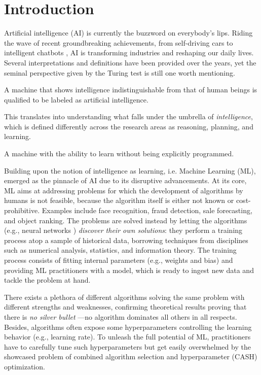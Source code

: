 \chapter{Introduction}
\label{chap:intro}

Artificial intelligence (AI) is currently the buzzword on everybody's lips.
Riding the wave of recent groundbreaking achievements, from self-driving cars \citep{} to intelligent chatbots \citep{}, AI is transforming industries and reshaping our daily lives.
Several interpretations and definitions have been provided over the years, yet the seminal perspective given by the Turing test \citep{turing1980computing} is still one worth mentioning.
\begin{definition}
A machine that shows intelligence indistinguishable from that of human beings is qualified to be labeled as artificial intelligence.
\end{definition}
This translates into understanding what falls under the umbrella of \textit{intelligence}, which is defined differently across the research areas as reasoning, planning, and learning.
\begin{definition}
A machine with the ability to learn without being explicitly programmed.
\end{definition}
Building upon the notion of intelligence as learning, i.e. Machine Learning (ML), emerged as the pinnacle of AI due to its disruptive advancements.
At its core, ML aims at addressing problems for which the development of algorithms by humans is not feasible, because the algorithm itself is either not known or cost-prohibitive.
Examples include face recognition, fraud detection, sale forecasting, and object ranking.
The problems are solved instead by letting the algorithms (e.g., neural networks \cite{nn}) \textit{discover their own solutions}: they perform a training process atop a sample of historical data, borrowing techniques from disciplines such as numerical analysis, statistics, and information theory.
The training process consists of fitting internal parameters (e.g., weights and bias) and providing ML practitioners with a model, which is ready to ingest new data and tackle the problem at hand.

There exists a plethora of different algorithms solving the same problem with different strengths and weaknesses, confirming theoretical results proving that there is \textit{no silver bullet} \cite{kerschke2019automated}---no algorithm dominates all others in all respects.
Besides, algorithms often expose some hyperparameters controlling the learning behavior (e.g., learning rate).
To unleash the full potential of ML, practitioners have to carefully tune such hyperparameters but get easily overwhelmed by the showcased problem of combined algorithm selection and hyperparameter (CASH) optimization.

